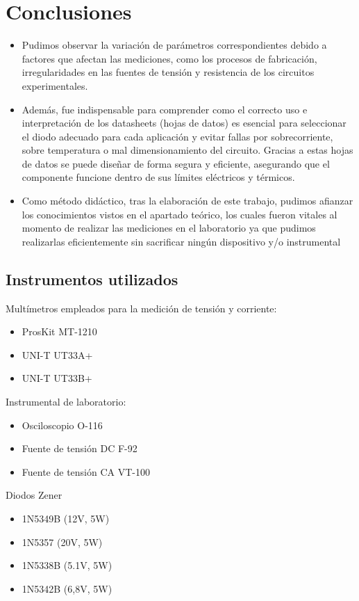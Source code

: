 \chapter{Conclusiones}

\begin{itemize}
    \item Pudimos observar la variación de parámetros correspondientes debido a factores que afectan las mediciones, como los procesos de fabricación, irregularidades en las fuentes de tensión y resistencia de los circuitos experimentales.

\item Además, fue indispensable para comprender como el correcto uso e interpretación de los datasheets (hojas de datos) es esencial para seleccionar el diodo adecuado para cada aplicación y evitar fallas por sobrecorriente, sobre temperatura o mal dimensionamiento del circuito. Gracias a estas hojas de datos se puede diseñar de forma segura y eficiente, asegurando que el componente funcione dentro de sus límites eléctricos y térmicos.

\item Como método didáctico, tras la elaboración de este trabajo, pudimos afianzar los conocimientos vistos en el apartado teórico, los cuales fueron vitales al momento de realizar las mediciones en el laboratorio ya que pudimos realizarlas eficientemente sin sacrificar ningún dispositivo y/o instrumental
\end{itemize}

\section{Instrumentos utilizados}
Multímetros empleados para la medición de tensión y corriente:
\begin{itemize}
    \item ProsKit MT-1210
    \item UNI-T UT33A+
    \item UNI-T UT33B+    
\end{itemize}

Instrumental de laboratorio: 
\begin{itemize}
    \item Osciloscopio O-116 
    \item Fuente de tensión DC F-92
    \item Fuente de tensión CA VT-100
\end{itemize}

Diodos Zener 
\begin{itemize}
    \item 1N5349B (12V, 5W)
    \item 1N5357 (20V, 5W)
    \item 1N5338B (5.1V, 5W)
    \item 1N5342B (6,8V, 5W)
\end{itemize}

